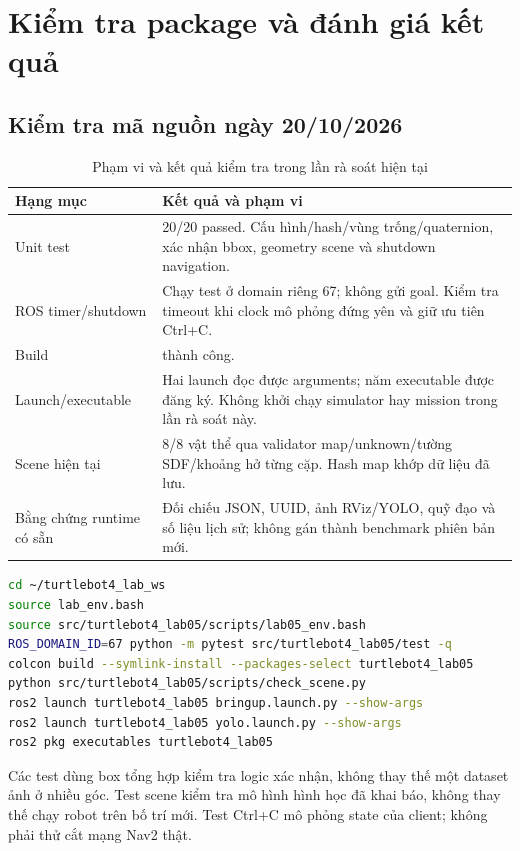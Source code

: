 \clearpage
\section{Kiểm tra package và đánh giá kết quả}
\subsection{Kiểm tra mã nguồn ngày 20/10/2026}
\begin{table}[H]\centering\small
\caption{Phạm vi và kết quả kiểm tra trong lần rà soát hiện tại}\label{tab:checks}
\begin{tabularx}{\linewidth}{@{}P{4.3cm}Y@{}}\toprule
Hạng mục&Kết quả và phạm vi\\\midrule
Unit test&20/20 passed. Cấu hình/hash/vùng trống/quaternion, xác nhận bbox, geometry scene và shutdown navigation.\\
ROS timer/shutdown&Chạy test ở domain riêng 67; không gửi goal. Kiểm tra timeout khi clock mô phỏng đứng yên và giữ ưu tiên Ctrl+C.\\
Build& thành công.\\
Launch/executable&Hai launch đọc được arguments; năm executable được đăng ký. Không khởi chạy simulator hay mission trong lần rà soát này.\\
Scene hiện tại&8/8 vật thể qua validator map/unknown/tường SDF/khoảng hở từng cặp. Hash map khớp dữ liệu đã lưu.\\
Bằng chứng runtime có sẵn&Đối chiếu JSON, UUID, ảnh RViz/YOLO, quỹ đạo và số liệu lịch sử; không gán thành benchmark phiên bản mới.\\\bottomrule
\end{tabularx}\end{table}
\begin{lstlisting}[language=bash,caption={Lệnh tái lập kiểm tra không điều khiển robot},label={lst:checks}]
cd ~/turtlebot4_lab_ws
source lab_env.bash
source src/turtlebot4_lab05/scripts/lab05_env.bash
ROS_DOMAIN_ID=67 python -m pytest src/turtlebot4_lab05/test -q
colcon build --symlink-install --packages-select turtlebot4_lab05
python src/turtlebot4_lab05/scripts/check_scene.py
ros2 launch turtlebot4_lab05 bringup.launch.py --show-args
ros2 launch turtlebot4_lab05 yolo.launch.py --show-args
ros2 pkg executables turtlebot4_lab05
\end{lstlisting}
Các test dùng box tổng hợp kiểm tra logic xác nhận, không thay thế một dataset ảnh ở nhiều góc. Test scene kiểm tra mô hình hình học đã khai báo, không thay thế chạy robot trên bố trí mới. Test Ctrl+C mô phỏng state của client; không phải thử cắt mạng Nav2 thật.

